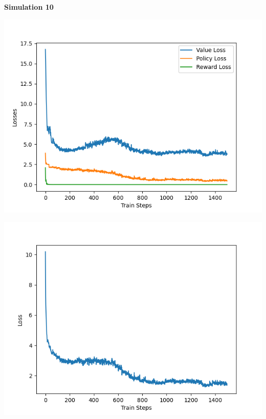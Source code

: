 \documentclass[12pt]{article}
\begin{document}
\begin{tcolorbox}[height=45em, width=\textwidth]
    \begin{center}
        \textbf{Simulation 10} \\
        \begin{minipage}{0.32\textwidth}
            \includegraphics[width=\textwidth]{outputs/plots/sim_10/training/individual_losses.png}
        \end{minipage}%
        \hfill%
        \begin{minipage}{0.32\textwidth}
            \includegraphics[width=\textwidth]{outputs/plots/sim_10/training/total_loss.png}
        \end{minipage}%

\end{center}
\end{tcolorbox}
\end{document}
